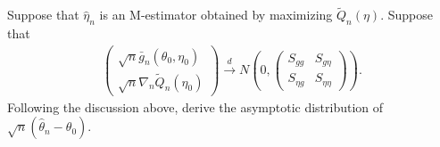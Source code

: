 \documentclass[11pt,letterpaper]{article}                  %
\begin{document}
\bigskip
\begin{problem}
Suppose that $\hat{\eta}_n$ is an M-estimator obtained by maximizing $\tilde{Q}_n (\eta)$.
Suppose that 
\begin{align*}
	\begin{pmatrix} \sqrt{n} \bar{g}_n (\theta_0, \eta_0) \\ \sqrt{n} \nabla_n \tilde{Q}_n (\eta_0) \end{pmatrix} \overset{d}{\to}
	N \left( 0, \begin{pmatrix} S_{gg} & S_{g \eta} \\ S_{\eta g} & S_{\eta \eta} \end{pmatrix} \right).
\end{align*}
Following the discussion above, derive the asymptotic distribution of $\sqrt{n} (\hat{\theta}_n - \theta_0)$.


\end{problem}
\end{document}
